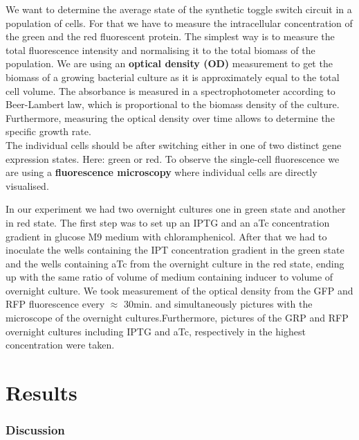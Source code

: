 \documentclass[english,11pt,a4paper]{article}
\begin{document}
We want to determine the average state of the synthetic toggle switch circuit in a population of cells. For that we have to measure the intracellular concentration of the green and the red fluorescent protein. 
The simplest way is to measure the total fluorescence intensity and normalising it to the total biomass of the population. 
We are using an \textbf{optical density (OD)} measurement to get the biomass of a growing bacterial culture as it is approximately equal to the total cell volume.
The absorbance is measured in a spectrophotometer according to Beer-Lambert law, which is proportional to the biomass density of the culture. Furthermore, measuring the optical density over time allows to determine the specific growth rate.
\\
The individual cells should be after switching either in one of two distinct gene expression states. Here: green or red. 
To observe the single-cell fluorescence we are using a \textbf{fluorescence microscopy} where individual cells are directly visualised.
\bigskip

In our experiment we had two overnight cultures one in green state and another in red state. The first step was to set up an IPTG and an aTc concentration gradient in glucose M9 medium with chloramphenicol. After that we had to inoculate the wells containing the IPT concentration gradient in the green state and the wells containing aTc from the overnight culture in the red state, ending up with the same ratio of volume of medium containing inducer to volume of overnight culture.
We took measurement of the optical density from the GFP and RFP fluorescence every $\approx$ 30min. and simultaneously pictures with the microscope of the overnight cultures.Furthermore, pictures of the GRP and RFP overnight cultures including IPTG and aTc, respectively in the highest concentration were taken.


 \newpage
\part{Results}

\section{Discussion}


\pagebreak

\printbibliography
\end{document}
